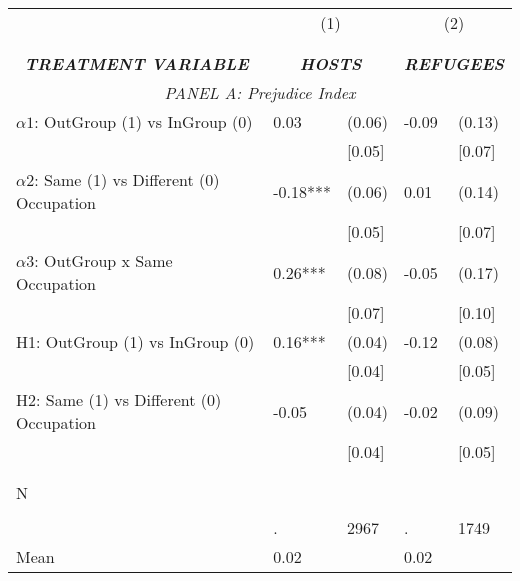 \begin{tabular}{l*{4}{l}} \toprule 
                &\multicolumn{2}{c}{(1)}&\multicolumn{2}{c}{(2)}\\
                &\multicolumn{2}{c}{ } &\multicolumn{2}{c}{ } \\
\\[-0.6cm] \multicolumn{1}{c}{\textit{\textbf{TREATMENT VARIABLE}}} & \multicolumn{2}{c}{\textit{\textbf{HOSTS}}} & \multicolumn{2}{c}{\textit{\textbf{REFUGEES}}} \\  \multicolumn{5}{c}{\textit{PANEL A: Prejudice Index}} \\  \midrule  
$\alpha1$: OutGroup (1) vs InGroup (0)&     0.03   &   (0.06)&    -0.09   &   (0.13)\\
 
                &         &   [0.05]&         &   [0.07]\\
 
$\alpha2$: Same (1) vs Different (0) Occupation&    -0.18***&   (0.06)&     0.01   &   (0.14)\\
 
                &         &   [0.05]&         &   [0.07]\\
 
$\alpha3$: OutGroup x Same Occupation&     0.26***&   (0.08)&    -0.05   &   (0.17)\\
 
                &         &   [0.07]&         &   [0.10]\\
 
H1: OutGroup (1) vs InGroup (0)&     0.16***&   (0.04)&    -0.12   &   (0.08)\\
 
                &         &   [0.04]&         &   [0.05]\\
 
H2: Same (1) vs Different (0) Occupation&    -0.05   &   (0.04)&    -0.02   &   (0.09)\\
 
                &         &   [0.04]&         &   [0.05]\\
 
\\\\[-0.5cm] N \\\\[-0.6cm]&        .&     2967&        .&     1749\\
Mean            &     0.02&         &     0.02&         \\
 
\bottomrule  \end{tabular}  
